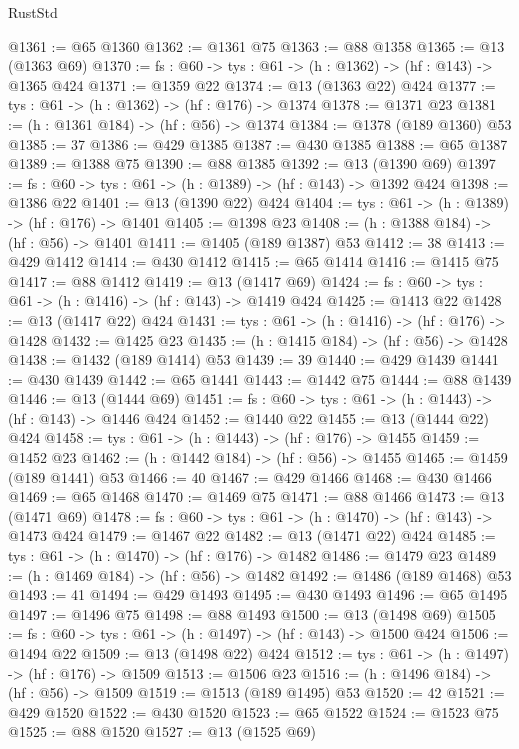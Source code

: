 \begin{lexlean}{RustStd}
\begin{coremodule}
@1361 := @65 @1360
@1362 := @1361 @75
@1363 := @88 @1358
@1365 := @13 (@1363 @69)
@1370 := {fs : @60} -> {tys : @61} -> (h : @1362) -> (hf : @143) -> @1365 @424
@1371 := @1359 @22
@1374 := @13 (@1363 @22) @424
@1377 := {tys : @61} -> (h : @1362) -> (hf : @176) -> @1374
@1378 := @1371 @23
@1381 := (h : @1361 @184) -> (hf : @56) -> @1374
@1384 := @1378 (@189 @1360) @53
@1385 := 37
@1386 := @429 @1385
@1387 := @430 @1385
@1388 := @65 @1387
@1389 := @1388 @75
@1390 := @88 @1385
@1392 := @13 (@1390 @69)
@1397 := {fs : @60} -> {tys : @61} -> (h : @1389) -> (hf : @143) -> @1392 @424
@1398 := @1386 @22
@1401 := @13 (@1390 @22) @424
@1404 := {tys : @61} -> (h : @1389) -> (hf : @176) -> @1401
@1405 := @1398 @23
@1408 := (h : @1388 @184) -> (hf : @56) -> @1401
@1411 := @1405 (@189 @1387) @53
@1412 := 38
@1413 := @429 @1412
@1414 := @430 @1412
@1415 := @65 @1414
@1416 := @1415 @75
@1417 := @88 @1412
@1419 := @13 (@1417 @69)
@1424 := {fs : @60} -> {tys : @61} -> (h : @1416) -> (hf : @143) -> @1419 @424
@1425 := @1413 @22
@1428 := @13 (@1417 @22) @424
@1431 := {tys : @61} -> (h : @1416) -> (hf : @176) -> @1428
@1432 := @1425 @23
@1435 := (h : @1415 @184) -> (hf : @56) -> @1428
@1438 := @1432 (@189 @1414) @53
@1439 := 39
@1440 := @429 @1439
@1441 := @430 @1439
@1442 := @65 @1441
@1443 := @1442 @75
@1444 := @88 @1439
@1446 := @13 (@1444 @69)
@1451 := {fs : @60} -> {tys : @61} -> (h : @1443) -> (hf : @143) -> @1446 @424
@1452 := @1440 @22
@1455 := @13 (@1444 @22) @424
@1458 := {tys : @61} -> (h : @1443) -> (hf : @176) -> @1455
@1459 := @1452 @23
@1462 := (h : @1442 @184) -> (hf : @56) -> @1455
@1465 := @1459 (@189 @1441) @53
@1466 := 40
@1467 := @429 @1466
@1468 := @430 @1466
@1469 := @65 @1468
@1470 := @1469 @75
@1471 := @88 @1466
@1473 := @13 (@1471 @69)
@1478 := {fs : @60} -> {tys : @61} -> (h : @1470) -> (hf : @143) -> @1473 @424
@1479 := @1467 @22
@1482 := @13 (@1471 @22) @424
@1485 := {tys : @61} -> (h : @1470) -> (hf : @176) -> @1482
@1486 := @1479 @23
@1489 := (h : @1469 @184) -> (hf : @56) -> @1482
@1492 := @1486 (@189 @1468) @53
@1493 := 41
@1494 := @429 @1493
@1495 := @430 @1493
@1496 := @65 @1495
@1497 := @1496 @75
@1498 := @88 @1493
@1500 := @13 (@1498 @69)
@1505 := {fs : @60} -> {tys : @61} -> (h : @1497) -> (hf : @143) -> @1500 @424
@1506 := @1494 @22
@1509 := @13 (@1498 @22) @424
@1512 := {tys : @61} -> (h : @1497) -> (hf : @176) -> @1509
@1513 := @1506 @23
@1516 := (h : @1496 @184) -> (hf : @56) -> @1509
@1519 := @1513 (@189 @1495) @53
@1520 := 42
@1521 := @429 @1520
@1522 := @430 @1520
@1523 := @65 @1522
@1524 := @1523 @75
@1525 := @88 @1520
@1527 := @13 (@1525 @69)

\end{coremodule}
\end{lexlean}
